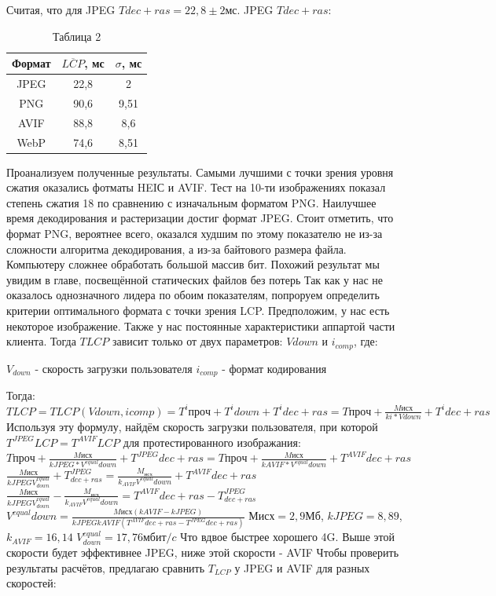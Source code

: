 \documentclass[12pt]{article}
\begin{document}
    Считая, что для JPEG $T{dec+ras} = 22,8 \pm 2мс$. JPEG $T{dec+ras}$:
    \begin{table}[h!]
        \centering
        \caption{Таблица 2}
        \begin{tabular}{|c|c|c|}
            \hline
            Формат & $\overline{LCP}$, мс & $\sigma$, мс \\
            \hline
            JPEG   & 22,8                 & 2            \\
            \hline
            PNG    & 90,6                 & 9,51         \\
            \hline
            AVIF   & 88,8                 & 8,6          \\
            \hline
            WebP   & 74,6                 & 8,51         \\
            \hline
        \end{tabular}
    \end{table}

    Проанализуем полученные результаты. Самыми лучшими с точки зрения уровня сжатия оказались фотматы HEIС и AVIF.
    Тест на 10-ти изображениях показал степень сжатия 18 по сравнению с изначальным форматом PNG.
    Наилучшее время декодирования и растеризации достиг формат JPEG. Стоит отметить, что формат PNG, вероятнее всего, оказался худшим по этому показателю не из-за сложности алгоритма декодирования, а из-за байтового размера файла. Компьютеру сложнее обработать большой массив бит. Похожий результат мы увидим в главе, посвещённой статических файлов без потерь
    Так как у нас не оказалось однозначного лидера по обоим показателям, попроруем определить критерии оптимального формата с точки зрения LCP. Предположим, у нас есть некоторое изображение.
    Также у нас постоянные характеристики аппартой части клиента. Тогда $T{LCP}$ зависит только от двух параметров: $V{down}$ и $i_{comp}$, где:

$V_{down}$ - скорость загрузки пользователя
$i_{comp}$ - формат кодирования

    Тогда:
$
T{LCP} = T{LCP}(V{down}, i{comp}) = T^{i}{проч} + T^{i}{down} + T^{i}{dec+ras} = T{проч} + \frac{M{исх}}{k{i}*V{down}} + T^{i}{dec+ras}
$
    Используя эту формулу, найдём скорость загрузки пользователя, при которой $T^{JPEG}{LCP} = T^{AVIF}{LCP}$ для протестированного изображания:
$
T{проч} + \frac{M{исх}}{k{JPEG}*V^{equal}{down}} + T^{JPEG}{dec+ras} = T{проч} + \frac{M{исх}}{k{AVIF}*V^{equal}{down}} + T^{AVIF}{dec+ras}
$
$
\frac{M{исх}}{k{JPEG}V^{equal}_{down}} + T^{JPEG}_{dec+ras} = \frac{M_{исх}}{k_{AVIF}V^{equal}{down}} + T^{AVIF}{dec+ras}
$
$
\frac{M{исх}}{k{JPEG}V^{equal}_{down}} - \frac{M_{исх}}{k_{AVIF}V^{equal}{down}}  = T^{AVIF}{dec+ras} - T^{JPEG}_{dec+ras}
$
$
V^{equal}{down} = \frac{M{исх}(k{AVIF}-k{JPEG})}{k{JPEG}k{AVIF}(T^{AVIF}{dec+ras} - T^{JPEG}{dec+ras})}
$
$М{исх} = 2,9$Мб, $k{JPEG} = 8,89$, $k_{AVIF} = 16,14$
$
V^{equal}_{down} = 17,76 мбит/c
$
    Что вдвое быстрее хорошего 4G. Выше этой скорости будет эффективнее JPEG, ниже этой скорости - AVIF
    Чтобы проверить результаты расчётов, предлагаю сравнить $T_{LCP}$ у JPEG и AVIF для разных скоростей:
\end{document}
